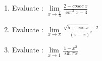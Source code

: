\documentclass[17pt]{extarticle}
\begin{document}
\begin{multicols}{2}
\begin{enumerate}
\item Evaluate : $ \lim\limits_{ x \to \frac {\pi}{3} } \frac{ 2 -  cosec\ x }{ \cot^2 x - 3  } $
 
\item Evaluate : $ \lim\limits_{ x \to \pi } \frac{ \sqrt{ 5 + \cos x } -2 }{ ( \pi - x )^2  } $
 
\item Evaluate : $ \lim\limits_{ x \to 1 } \frac{ 1 - x^2 }{ \sin \pi x  } $
 
 
 
 
 
 
\end{enumerate} 


\end{multicols}
 
\end{document}
